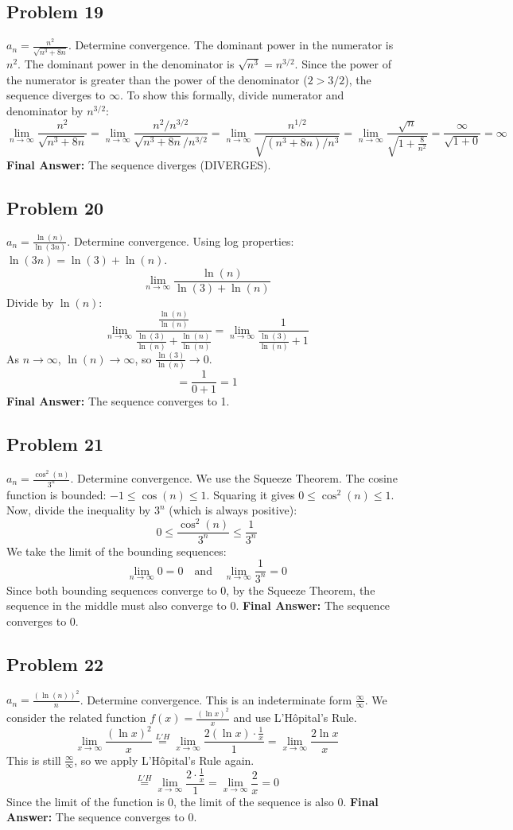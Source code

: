 \documentclass{article}
\begin{document}
\subsection{Problem 19}
$a_n = \frac{n^2}{\sqrt{n^3 + 8n}}$. Determine convergence.
The dominant power in the numerator is $n^2$. The dominant power in the denominator is $\sqrt{n^3} = n^{3/2}$. Since the power of the numerator is greater than the power of the denominator ($2 > 3/2$), the sequence diverges to $\infty$.
To show this formally, divide numerator and denominator by $n^{3/2}$:
\[ \lim_{n \to \infty} \frac{n^2}{\sqrt{n^3+8n}} = \lim_{n \to \infty} \frac{n^2/n^{3/2}}{\sqrt{n^3+8n}/n^{3/2}} = \lim_{n \to \infty} \frac{n^{1/2}}{\sqrt{(n^3+8n)/n^3}} = \lim_{n \to \infty} \frac{\sqrt{n}}{\sqrt{1+\frac{8}{n^2}}} = \frac{\infty}{\sqrt{1+0}} = \infty \]
\textbf{Final Answer:} The sequence diverges (DIVERGES).

\subsection{Problem 20}
$a_n = \frac{\ln(n)}{\ln(3n)}$. Determine convergence.
Using log properties: $\ln(3n) = \ln(3) + \ln(n)$.
\[ \lim_{n \to \infty} \frac{\ln(n)}{\ln(3)+\ln(n)} \]
Divide by $\ln(n)$:
\[ \lim_{n \to \infty} \frac{\frac{\ln(n)}{\ln(n)}}{\frac{\ln(3)}{\ln(n)}+\frac{\ln(n)}{\ln(n)}} = \lim_{n \to \infty} \frac{1}{\frac{\ln(3)}{\ln(n)}+1} \]
As $n \to \infty$, $\ln(n) \to \infty$, so $\frac{\ln(3)}{\ln(n)} \to 0$.
\[ = \frac{1}{0+1} = 1 \]
\textbf{Final Answer:} The sequence converges to 1.

\subsection{Problem 21}
$a_n = \frac{\cos^2(n)}{3^n}$. Determine convergence.
We use the Squeeze Theorem. The cosine function is bounded: $-1 \le \cos(n) \le 1$. Squaring it gives $0 \le \cos^2(n) \le 1$.
Now, divide the inequality by $3^n$ (which is always positive):
\[ 0 \le \frac{\cos^2(n)}{3^n} \le \frac{1}{3^n} \]
We take the limit of the bounding sequences:
\[ \lim_{n \to \infty} 0 = 0 \quad \text{and} \quad \lim_{n \to \infty} \frac{1}{3^n} = 0 \]
Since both bounding sequences converge to 0, by the Squeeze Theorem, the sequence in the middle must also converge to 0.
\textbf{Final Answer:} The sequence converges to 0.

\subsection{Problem 22}
$a_n = \frac{(\ln(n))^2}{n}$. Determine convergence.
This is an indeterminate form $\frac{\infty}{\infty}$. We consider the related function $f(x) = \frac{(\ln x)^2}{x}$ and use L'Hôpital's Rule.
\[ \lim_{x \to \infty} \frac{(\ln x)^2}{x} \overset{L'H}{=} \lim_{x \to \infty} \frac{2(\ln x) \cdot \frac{1}{x}}{1} = \lim_{x \to \infty} \frac{2 \ln x}{x} \]
This is still $\frac{\infty}{\infty}$, so we apply L'Hôpital's Rule again.
\[ \overset{L'H}{=} \lim_{x \to \infty} \frac{2 \cdot \frac{1}{x}}{1} = \lim_{x \to \infty} \frac{2}{x} = 0 \]
Since the limit of the function is 0, the limit of the sequence is also 0.
\textbf{Final Answer:} The sequence converges to 0.
\end{document}
